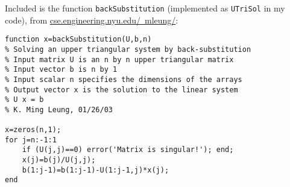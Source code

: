 \documentclass{template}
\begin{document}
Included is the function \verb|backSubstitution| (implemented as \verb|UTriSol| in my code), from \hyperlink{https://cse.engineering.nyu.edu/~mleung/CS3734/s03/ch02/backSubstitutionU.htm}{cse.engineering.nyu.edu/~mleung/}:

\begin{verbatim}
function x=backSubstitution(U,b,n)
% Solving an upper triangular system by back-substitution
% Input matrix U is an n by n upper triangular matrix
% Input vector b is n by 1
% Input scalar n specifies the dimensions of the arrays
% Output vector x is the solution to the linear system
% U x = b
% K. Ming Leung, 01/26/03

x=zeros(n,1);
for j=n:-1:1
    if (U(j,j)==0) error('Matrix is singular!'); end;
    x(j)=b(j)/U(j,j);
    b(1:j-1)=b(1:j-1)-U(1:j-1,j)*x(j);
end
\end{verbatim}

% 

\end{document}
